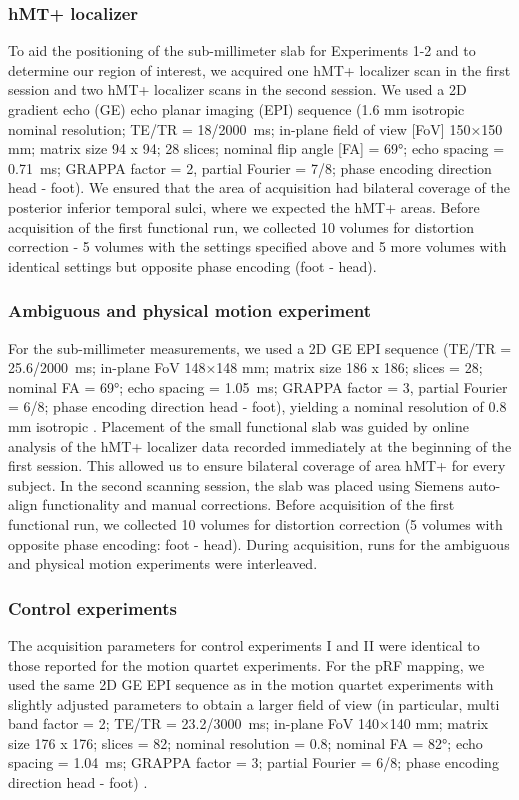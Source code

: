 \subsubsection{hMT+ localizer}
To aid the positioning of the sub-millimeter slab for Experiments 1-2 and to determine our region of interest, we acquired one hMT+ localizer scan in the first session and two hMT+ localizer scans in the second session. We used a 2D gradient echo (GE) echo planar imaging (EPI) sequence (1.6 mm isotropic nominal resolution; TE/TR = 18/2000~ms; in-plane field of view [FoV] 150×150 mm; matrix size 94 x 94; 28 slices; nominal flip angle [FA] = 69°; echo spacing = 0.71~ms; GRAPPA factor = 2, partial Fourier = 7/8; phase encoding direction head - foot). We ensured that the area of acquisition had bilateral coverage of the posterior inferior temporal sulci, where we expected the hMT+ areas. Before acquisition of the first functional run, we collected 10 volumes for distortion correction - 5 volumes with the settings specified above and 5 more volumes with identical settings but opposite phase encoding (foot - head).

\subsubsection{Ambiguous and physical motion experiment}
For the sub-millimeter measurements, we used a 2D GE EPI sequence (TE/TR = 25.6/2000~ms; in-plane FoV 148×148 mm; matrix size 186 x 186; slices = 28; nominal FA = 69°; echo spacing = 1.05~ms; GRAPPA factor = 3, partial Fourier = 6/8; phase encoding direction head - foot), yielding a nominal resolution of 0.8 mm isotropic \parencite{Moeller2010, Setsompop2012}. Placement of the small functional slab was guided by online analysis of the hMT+ localizer data recorded immediately at the beginning of the first session. This allowed us to ensure bilateral coverage of area hMT+ for every subject. In the second scanning session, the slab was placed using Siemens auto-align functionality and manual corrections. Before acquisition of the first functional run, we collected 10 volumes for distortion correction (5 volumes with opposite phase encoding: foot - head). During acquisition, runs for the ambiguous and physical motion experiments were interleaved.

\subsubsection{Control experiments}
The acquisition parameters for control experiments I and II were identical to those reported for the motion quartet experiments. For the pRF mapping, we used the same 2D GE EPI sequence as in the motion quartet experiments with slightly adjusted parameters to obtain a larger field of view (in particular, multi band factor = 2; TE/TR = 23.2/3000~ms; in-plane FoV 140×140 mm; matrix size 176 x 176; slices = 82; nominal resolution = 0.8; nominal FA = 82°; echo spacing = 1.04~ms; GRAPPA factor = 3; partial Fourier = 6/8; phase encoding direction head - foot) \parencite{Moeller2010, Setsompop2012, Feinberg2010}.

